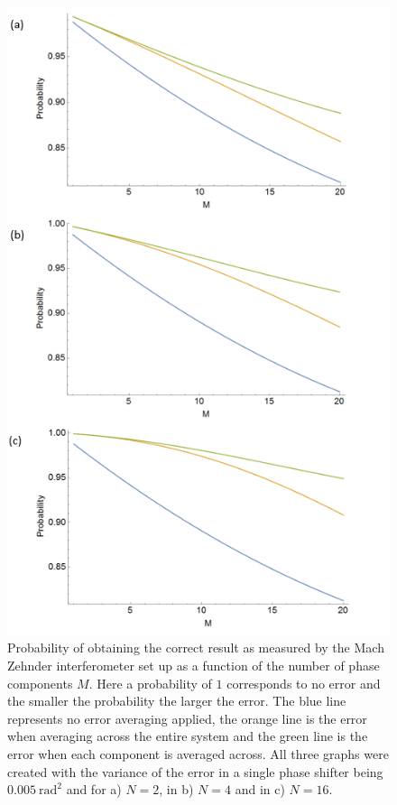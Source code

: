 \documentclass[aps,pra,twocolumn,superscriptaddress,numerical]{revtex4-1}
\begin{document}
			\begin{figure}
				\begin{centering}
					\includegraphics[width=\columnwidth]{Error_all.png}
					\par\end{centering}
				
				\caption[Error as measured by the Mach Zehnder interferometer set up as a function of the number of phase components. ]{Probability of obtaining the correct result as measured by the Mach Zehnder interferometer set up as a function of the number of phase components $M$. Here a probability of $1$ corresponds to no error and the smaller the probability the larger the error. The blue line	represents no error averaging applied, the orange line is the error	when averaging across the entire system and the green line is the error when each component is averaged across. All three graphs were created with the variance of the error in a single phase shifter being $0.005\ \textrm{rad}^{2}$ and for a) $N=2$, in b) $N=4$ and in c) $N=16$. \label{fig:Error-as-measured all}}
			\end{figure}
			
\end{document}
